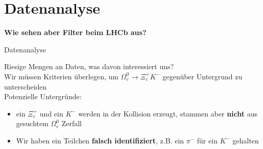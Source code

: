 
     
             
              
              
        

\section{Datenanalyse} 

\begin{frame}

\LARGE \textbf{ Wie sehen aber Filter beim LHCb aus?}
    
\end{frame}
\begin{frame}{Datenanalyse}

Riesige Mengen an Daten, was davon interessiert uns?\\ \pause
\vspace{0.2cm}
 Wir müssen Kriterien überlegen, um $\Omega_c^0 \rightarrow \Xi_c^+ K^-$ gegenüber Untergrund zu unterscheiden\\\pause 
\vspace{0.5cm}
Potenzielle Untergründe: 
\begin{itemize}
    \item ein $\Xi_c^+$ und ein $K^-$ werden in der Kollision erzeugt, stammen aber \textbf{nicht} aus gesuchtem $\Omega_c^0$ Zerfall\pause
    \item Wir haben ein Teilchen \textbf{falsch identifiziert}, z.B. ein $\pi^-$ für ein $K^-$ gehalten
\end{itemize}
\end{frame}
